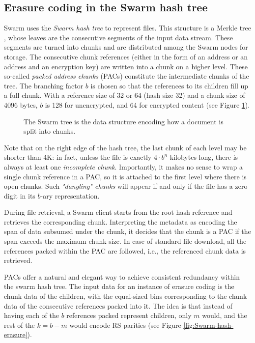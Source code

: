 \subsection{Erasure coding in the Swarm hash tree \statusgreen}
\label{sec:erasure-bmt}

Swarm uses the \emph{Swarm hash tree} to represent files. This structure is a Merkle tree \cite{merkle1980protocols}, whose leaves are the consecutive segments of the input data stream. These segments are turned into chunks and are distributed among the Swarm nodes for storage. The consecutive chunk references (either in the form of an address or an address and an encryption key) are written into a chunk on a higher level.
These so-called \emph{packed address chunks} (PACs) constitute the intermediate chunks of the tree.
The branching factor $b$ is chosen so that the references to its children fill up a full chunk.
With a reference size of 32 or 64 (hash size 32) and a chunk size of 4096 bytes, $b$ is 128 for unencrypted, and 64 for encrypted content 
(see Figure \ref{fig:Swarm-hash-split}).


\begin{figure}[!ht]
   \centering
   
   \caption[Swarm hash split \statusgreen]{The Swarm tree is the data structure encoding how a document is split into chunks.}
   \label{fig:Swarm-hash-split}
\end{figure}

Note that on the right edge of the hash tree, the last chunk of each level may be shorter than 4K: in fact, unless the file is exactly $4\cdot b^n$ kilobytes long, there is always at least one \emph{incomplete chunk}.  Importantly, it makes no sense to wrap a single chunk reference in a PAC, so it is attached to the first level where there is open chunks. Such \emph{"dangling" chunks} will appear if and only if the file has a zero digit in its $b$-ary representation. 

During file retrieval, a Swarm client starts from the root hash reference and retrieves the corresponding chunk. Interpreting the metadata as encoding the span of data subsumed under the chunk, it decides that the chunk is a PAC if the span exceeds the maximum chunk size. 
In case of standard file download, all the references packed within the PAC are followed, i.e., the referenced chunk data is retrieved. 

PACs offer a natural and elegant way to achieve consistent redundancy within the swarm hash tree.
The input data for an instance of erasure coding is the chunk data of the children, with the equal-sized bins corresponding to the chunk data of the consecutive references packed into it. The idea is that instead of having each of the $b$ references packed represent children, only $m$ would, and the rest of the $k=b-m$ would encode RS parities (see Figure \ref{fig:Swarm-hash-erasure}).


